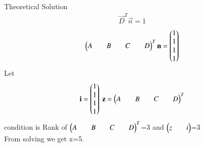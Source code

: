 \documentclass{beamer}
\begin{document}
\begin{frame}{Theoretical Solution}
\begin{align}
    \vec{D}^T\vec{n}=1
\end{align}
\begin{align}
    \begin{myvec}{A&&B&&C&&D}^T\end{myvec}\vec{n}=\begin{myvec}{1\\1\\1\\1}\end{myvec}
\end{align}
Let 
\begin{align}
    \vec{i}=\myvec{1\\1\\1\\1}\
    \vec{z}=\begin{myvec}{A&&B&&C&&D}^T\end{myvec}
\end{align}
condition is Rank of $\begin{myvec}{A&&B&&C&&D}^T\end{myvec}$=3
and $\begin{myvec}{z&&i}\end{myvec}$=3\\
From solving we get x=5.
\end{frame}
\end{document}
